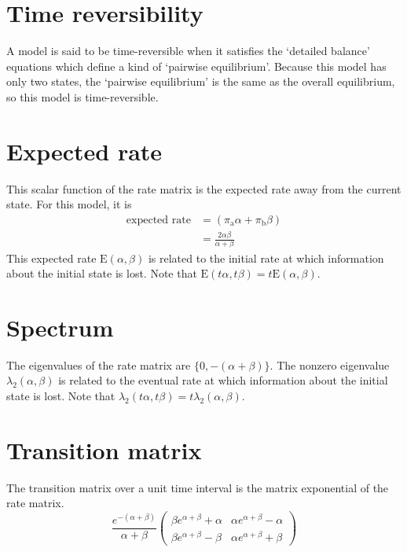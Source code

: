 \documentclass{article}
\providecommand{\Ao}{\text{a}}
\providecommand{\Bo}{\text{b}}
\providecommand{\Pa}{\alpha}
\providecommand{\Pb}{\beta}
\begin{document}
\section{Time reversibility}

A model is said to be time-reversible when it satisfies the
`detailed balance' equations which define a kind of `pairwise equilibrium'.
Because this model has only two states, the `pairwise equilibrium'
is the same as the overall equilibrium, so this model is time-reversible.

\section{Expected rate}

This scalar function of the rate matrix is the expected rate
away from the current state.
For this model, it is
\begin{align}
\text{expected rate}
&=
\left( \pi_\Ao \Pa + \pi_\Bo \Pb \right) \\
&=
\frac{2 \Pa \Pb}{\Pa + \Pb}
\end{align}
This expected rate
$\text{E} \left( \Pa, \Pb \right)$
is related to the initial rate at which
information about the initial state is lost.
Note that
$\text{E} \left( t \Pa, t \Pb \right) = t \text{E} \left( \Pa, \Pb \right)$.

\section{Spectrum}

The eigenvalues of the rate matrix are
$\{ 0, -\left( \Pa + \Pb \right) \}$.
The nonzero eigenvalue
$\lambda_2 \left( \Pa, \Pb \right)$
is related to the eventual rate
at which information about the initial state is lost.
Note that
$\lambda_2 \left( t \Pa, t \Pb \right) = t \lambda_2 \left( \Pa, \Pb \right)$.

\section{Transition matrix}

The transition matrix over a unit time interval
is the matrix exponential of the rate matrix.
\begin{equation}
	\frac{e^{-\left( \Pa + \Pb \right)}}{\Pa + \Pb}
	\begin{pmatrix}
		\Pb e^{\Pa + \Pb} + \Pa &
		\Pa e^{\Pa + \Pb} - \Pa \\
		\Pb e^{\Pa + \Pb} - \Pb &
		\Pa e^{\Pa + \Pb} + \Pb
	\end{pmatrix}
\end{equation}
\end{document}
